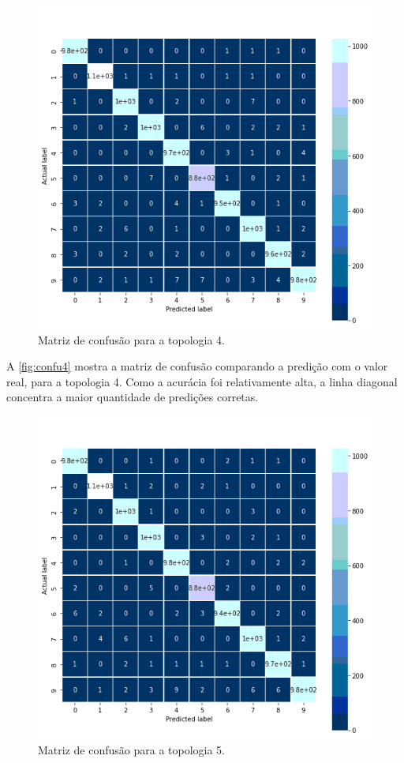 \documentclass[sigconf, nonacm, screen]{acmart}
\begin{document}
\begin{figure}[ht]
	\centering
	\includegraphics[width=0.8\linewidth]{img/confu4}
	\caption{Matriz de confusão para a topologia 4.}
	\label{fig:confu4}
\end{figure}

A \autoref{fig:confu4} mostra a matriz de confusão comparando a predição com o valor real, para a topologia 4. Como a acurácia foi relativamente alta, a linha diagonal concentra a maior quantidade de predições corretas.

\begin{figure}[ht]
	\centering
	\includegraphics[width=0.8\linewidth]{img/confu5}
	\caption{Matriz de confusão para a topologia 5.}
	\label{fig:confu5}
\end{figure}
\end{document}
